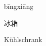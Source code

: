 \documentclass{article}
\begin{document}
\noindent
\begin{minipage}[t]{0.3\linewidth}
\centering
\Large bīngxiāng
\end{minipage}
\hfill
\begin{minipage}[t]{0.3\linewidth}
\centering
{\fontsize{24pt}{28pt}\selectfont 冰箱}
\end{minipage}
\hfill
\begin{minipage}[t]{0.3\linewidth}
\centering
\Large Kühlschrank
\end{minipage}
\end{document}
